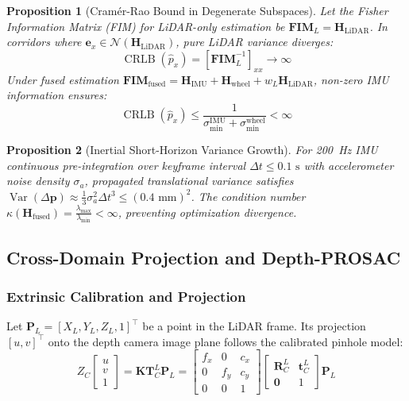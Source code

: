 \documentclass[journal]{IEEEtran}
\newtheorem{proposition}{Proposition}
\begin{document}
\begin{proposition}[Cram\'er-Rao Bound in Degenerate Subspaces]
Let the Fisher Information Matrix (FIM) for LiDAR-only estimation be $\mathbf{FIM}_L = \mathbf{H}_{\text{LiDAR}}$. In corridors where $\mathbf{e}_x \in \mathcal{N}(\mathbf{H}_{\text{LiDAR}})$, pure LiDAR variance diverges:
\begin{equation}
\operatorname{CRLB}(\hat{p}_x) = [\mathbf{FIM}_L^{-1}]_{xx} \to \infty
\end{equation}
Under fused estimation $\mathbf{FIM}_{\text{fused}} = \mathbf{H}_{\text{IMU}} + \mathbf{H}_{\text{wheel}} + w_L \mathbf{H}_{\text{LiDAR}}$, non-zero IMU information ensures:
\begin{equation}
\operatorname{CRLB}(\hat{p}_x) \le \frac{1}{\sigma_{\min}^{\text{IMU}} + \sigma_{\min}^{\text{wheel}}} < \infty
\end{equation}
\end{proposition}

\begin{proposition}[Inertial Short-Horizon Variance Growth]
For 200~Hz IMU continuous pre-integration over keyframe interval $\Delta t \le 0.1\text{ s}$ with accelerometer noise density $\sigma_a$, propagated translational variance satisfies $\operatorname{Var}(\Delta \mathbf{p}) \approx \frac{1}{3} \sigma_a^2 \Delta t^3 \le (0.4\text{ mm})^2$. The condition number $\kappa(\mathbf{H}_{\text{fused}}) = \frac{\lambda_{\max}}{\lambda_{\min}} < \infty$, preventing optimization divergence.
\end{proposition}

\subsection{Cross-Domain Projection and Depth-PROSAC}

\subsubsection{Extrinsic Calibration and Projection}
Let $\mathbf{P}_L = [X_L, Y_L, Z_L, 1]^{\top}$ be a point in the LiDAR frame. Its projection $[u, v]^\top$ onto the depth camera image plane follows the calibrated pinhole model:
\begin{equation}
Z_C \begin{bmatrix} u \\ v \\ 1 \end{bmatrix} = \mathbf{K} \mathbf{T}_C^L \mathbf{P}_L = \begin{bmatrix} f_x & 0 & c_x \\ 0 & f_y & c_y \\ 0 & 0 & 1 \end{bmatrix} \begin{bmatrix} \mathbf{R}_C^L & \mathbf{t}_C^L \\ \mathbf{0} & 1 \end{bmatrix} \mathbf{P}_L
\end{equation}
\end{document}
